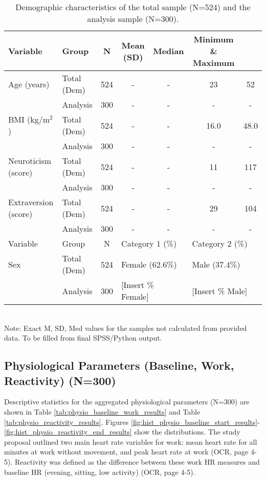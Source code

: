 \documentclass[11pt, a4paper]{report}
\begin{document}
\begin{table}[H]
\centering
\caption{Demographic characteristics of the total sample (N=524) and the analysis sample (N=300).}
\label{tab:demographics_results}
\begin{tabular}{@{}l l c c c c c@{}}
\toprule
Variable                & Group        & N   & Mean (SD) & Median & Minimum \& Maximum \\
\midrule
Age (years)             & Total (Dem)  & 524 &  -        & -      & 23      & 52      \\
                        & Analysis     & 300 &  -        & -      & -       & -       \\
BMI (kg/m$^2$)          & Total (Dem)  & 524 &  -        & -      & 16.0    & 48.0    \\
                        & Analysis     & 300 &  -        & -      & -       & -       \\
Neuroticism (score)     & Total (Dem)  & 524 &  -        & -      & 11      & 117     \\
                        & Analysis     & 300 &  -        & -      & -       & -       \\
Extraversion (score)    & Total (Dem)  & 524 &  -        & -      & 29      & 104     \\
                        & Analysis     & 300 &  -        & -      & -       & -       \\ \midrule
Variable                & Group        & N   & \multicolumn{2}{l}{Category 1 (\%)} & \multicolumn{2}{l}{Category 2 (\%)} \\ \midrule
Sex                     & Total (Dem)  & 524 & \multicolumn{2}{l}{Female (62.6\%)} & \multicolumn{2}{l}{Male (37.4\%)} \\
                        & Analysis     & 300 & \multicolumn{2}{l}{[Insert \% Female]} & \multicolumn{2}{l}{[Insert \% Male]} \\
\bottomrule
\end{tabular}
\\ \footnotesize{Note: Exact M, SD, Med values for the samples not calculated from provided data. To be filled from final SPSS/Python output.}
\end{table}

\subsection{Physiological Parameters (Baseline, Work, Reactivity) (N=300)}
\label{subsec:results_physio_sample} %
Descriptive statistics for the aggregated physiological parameters (N=300) are shown in Table \ref{tab:physio_baseline_work_results} and Table \ref{tab:physio_reactivity_results}. Figures \ref{fig:hist_physio_baseline_start_results}-\ref{fig:hist_physio_reactivity_end_results} show the distributions. The study proposal outlined two main heart rate variables for work: mean heart rate for all minutes at work without movement, and peak heart rate at work \cite{ThesisTempPDF} (OCR, page 4-5). Reactivity was defined as the difference between these work HR measures and baseline HR (evening, sitting, low activity) \cite{ThesisTempPDF} (OCR, page 4-5).
\end{document}
